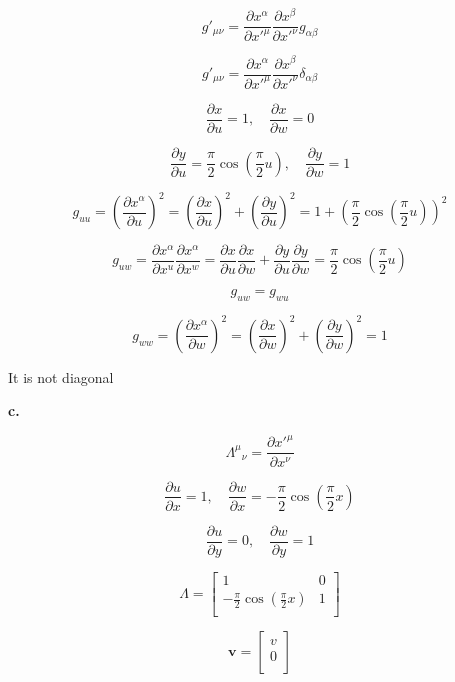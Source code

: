 \documentclass[12pt]{article}
\begin{document}
\[
      g'_{\mu\nu} = \frac{\partial x^\alpha}{\partial x'^\mu} \frac{\partial x^\beta}{\partial x'^\nu} g_{\alpha\beta}
\]

\[
      g'_{\mu\nu} = \frac{\partial x^\alpha}{\partial x'^\mu} \frac{\partial x^\beta}{\partial x'^\nu} \delta_{\alpha\beta}
\]

\[
      \frac{\partial x}{\partial u} = 1, \quad \frac{\partial x}{\partial w} = 0
\]

\[
      \frac{\partial y}{\partial u} = \frac{\pi}{2} \cos(\frac{\pi}{2}u), \quad \frac{\partial y}{\partial w} = 1
\]

\[
      g_{u u} = {(\frac{\partial x^\alpha}{\partial u})}^2 =
      {(\frac{\partial x}{\partial u})}^2 + {(\frac{\partial y}{\partial u})}^2=
      1 + {(\frac{\pi}{2} \cos(\frac{\pi}{2}u))}^2
\]

\[
      g_{u w} = \frac{\partial x^\alpha}{\partial x^u} \frac{\partial x^\alpha}{\partial x^w} =
      \frac{\partial x}{\partial u} \frac{\partial x}{\partial w} + \frac{\partial y}{\partial u} \frac{\partial y}{\partial w} =
      \frac{\pi}{2} \cos(\frac{\pi}{2}u)
\]

\[
      g_{u w} =  g_{w u}
\]

\[
      g_{w w} = {(\frac{\partial x^\alpha}{\partial w})}^2 =
      {(\frac{\partial x}{\partial w})}^2 + {(\frac{\partial y}{\partial w})}^2=
      1
\]

It is not diagonal

\textbf{c.}

\[
      {\Lambda^\mu}_\nu = \frac{\partial {x'}^\mu}{\partial x^\nu}
\]

\[
      \frac{\partial u}{\partial x} = 1, \quad \frac{\partial w}{\partial x} = -\frac{\pi}{2} \cos(\frac{\pi}{2}x)
\]

\[
      \frac{\partial u}{\partial y} = 0, \quad \frac{\partial w}{\partial y} = 1
\]

\[
      \Lambda = \begin{bmatrix}
            1                                   & 0 \\
            -\frac{\pi}{2} \cos(\frac{\pi}{2}x) & 1 \\
      \end{bmatrix}
\]

\[
      \mathbf{v} =
      \begin{bmatrix}
            v \\
            0 \\
      \end{bmatrix}
\]
\end{document}
